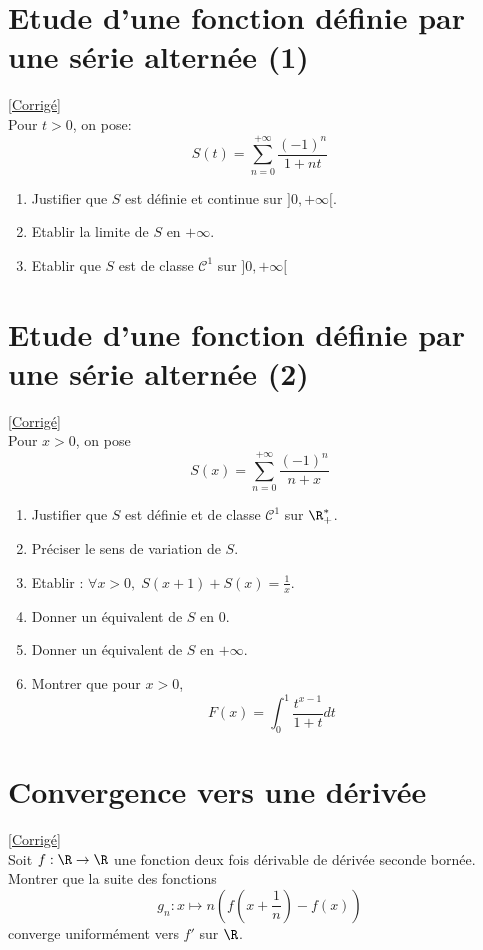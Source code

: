 \documentclass{book}
\begin{document}
	\section{Etude d'une fonction définie par une série alternée (1)}
	\textcolor{blue}{\hyperref[sec:etude-dune-fonction-definie-par-une-serie-alternee-1]{[Corrigé]}}\\
	\label{Etude d'une fonction définie par une série alternée 1}
	Pour $t>0$, on pose: $$S(t)=\sum_{n=0}^{+\infty}\frac{(-1)^n}{1+nt}$$
	\begin{enumerate}
		\item Justifier que $S$ est définie et continue sur $]0,+\infty[$.
		\item Etablir la limite de $S$ en $+\infty$.
		\item Etablir que $S$ est de classe $\mathcal{C}^1$ sur $]0,+\infty[$
	\end{enumerate}
	
	\section{Etude d'une fonction définie par une série alternée (2)}
	\textcolor{blue}{\hyperref[sec:etude-dune-fonction-definie-par-une-serie-alternee-2]{[Corrigé]}}\\
	\label{Etude d'une fonction définie par une série alternée 2}
	Pour $x>0$, on pose $$S(x)=\sum_{n=0}^{+\infty}\frac{(-1)^n}{n+x}$$
	\begin{enumerate}
		\item Justifier que $S$ est définie et de classe $\mathcal{C}^1$ sur $\R^*_+$.
		\item Préciser le sens de variation de $S$.
		\item Etablir : $\displaystyle \forall x>0, \; S(x+1)+S(x)=\frac{1}{x}$.
		\item Donner un équivalent de $S$ en 0.
		\item Donner un équivalent de $S$ en $+\infty$.
		\item Montrer que pour $x>0$, $$F(x)=\int_0^1\frac{t^{x-1}}{1+t}dt$$
	\end{enumerate}
	
	\section{Convergence vers une dérivée}
	\textcolor{blue}{\hyperref[sec:convergence-vers-une-derivee]{[Corrigé]}}\\
	\label{Convergence vers une dérivée}
	Soit $f:\R\to\R$ une fonction deux fois dérivable de dérivée seconde bornée.
	\\Montrer que la suite des fonctions $$g_n:x\mapsto n\left(f\left(x+\frac{1}{n}\right)-f(x)\right)$$ converge uniformément vers $f'$ sur $\R$.
	
\end{document}
